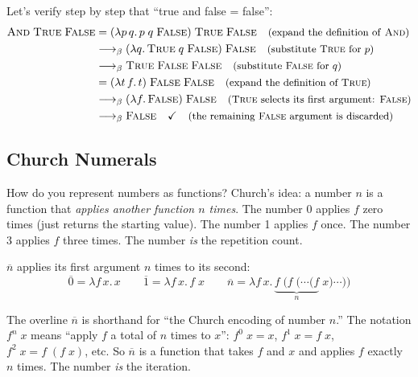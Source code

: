 \documentclass[11pt,a4paper]{article}
\theoremstyle{definition}
\newcommand{\lam}{\lambda}
\newcommand{\reduce}{\longrightarrow_\beta}
\newcommand{\church}[1]{\overline{#1}}
\newcommand{\TR}{\textsc{True}}
\newcommand{\FL}{\textsc{False}}
\newcommand{\rmark}[1]{\quad\text{\small(#1)}}
\begin{document}
\begin{workedexample}[$\textsc{And}\;\TR\;\FL = \FL$]
Let's verify step by step that ``true and false = false'':
\begin{align*}
  \textsc{And}\;\TR\;\FL
  &= (\lam p\, q.\, p\; q\; \FL)\;\TR\;\FL
    \rmark{expand the definition of \textsc{And}} \\
  &\reduce (\lam q.\, \TR\; q\; \FL)\;\FL
    \rmark{substitute $\TR$ for $p$} \\
  &\reduce \TR\;\FL\;\FL
    \rmark{substitute $\FL$ for $q$} \\
  &= (\lam t\, f.\, t)\;\FL\;\FL
    \rmark{expand the definition of $\TR$} \\
  &\reduce (\lam f.\, \FL)\;\FL
    \rmark{$\TR$ selects its first argument: $\FL$} \\
  &\reduce \FL \quad\checkmark
    \rmark{the remaining $\FL$ argument is discarded}
\end{align*}
\end{workedexample}

\subsection{Church Numerals}\label{sec:churchnums}

How do you represent numbers as functions? Church's idea: a number $n$ is a
function that \emph{applies another function $n$ times}. The number 0 applies
$f$ zero times (just returns the starting value). The number 1 applies $f$
once. The number 3 applies $f$ three times. The number \emph{is} the
repetition count.

\begin{defnbox}
$\church{n}$ applies its first argument $n$ times to its second:
\[
\church{0} = \lam f\, x.\, x
\qquad
\church{1} = \lam f\, x.\, f\;x
\qquad
\church{n} = \lam f\, x.\, \underbrace{f\;(f\;(\cdots(f}_{n}\; x)\cdots))
\]
\end{defnbox}

\begin{intuition}
The overline $\church{n}$ is shorthand for ``the Church encoding of number
$n$.'' The notation $f^n\;x$ means ``apply $f$ a total of $n$ times to $x$'':
$f^0\;x = x$, $f^1\;x = f\;x$, $f^2\;x = f\;(f\;x)$, etc. So $\church{n}$
is a function that takes $f$ and $x$ and applies $f$ exactly $n$ times. The
number \emph{is} the iteration.
\end{intuition}
\end{document}

